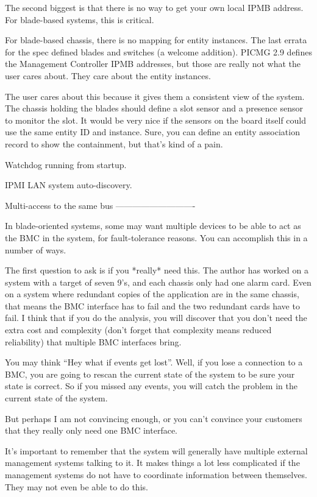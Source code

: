 The second biggest is that there is no way to get your own local IPMB
address.  For blade-based systems, this is critical.

For blade-based chassis, there is no mapping for entity instances.
The last errata for the spec defined blades and switches (a welcome
addition).  PICMG 2.9 defines the Management Controller IPMB
addresses, but those are really not what the user cares about.  They
care about the entity instances.

The user cares about this because it gives them a consistent view of
the system.  The chassis holding the blades should define a slot
sensor and a presence sensor to monitor the slot.  It would be very
nice if the sensors on the board itself could use the same entity ID
and instance.  Sure, you can define an entity association record to
show the containment, but that's kind of a pain.

Watchdog running from startup.

IPMI LAN system auto-discovery.


Multi-access to the same bus
----------------------------

In blade-oriented systems, some may want multiple devices to be able
to act as the BMC in the system, for fault-tolerance reasons.  You can
accomplish this in a number of ways.

The first question to ask is if you *really* need this.  The author
has worked on a system with a target of seven 9's, and each chassis
only had one alarm card.  Even on a system where redundant copies of
the application are in the same chassis, that means the BMC interface
has to fail and the two redundant cards have to fail.  I think that if
you do the analysis, you will discover that you don't need the extra
cost and complexity (don't forget that complexity means reduced
reliability) that multiple BMC interfaces bring.

You may think ``Hey what if events get lost''.  Well, if you lose a
connection to a BMC, you are going to rescan the current state of the
system to be sure your state is correct.  So if you missed any events,
you will catch the problem in the current state of the system.

But perhaps I am not convincing enough, or you can't convince your
customers that they really only need one BMC interface.

It's important to remember that the system will generally have
multiple external management systems talking to it.  It makes things a
lot less complicated if the management systems do not have to
coordinate information between themselves.  They may not even be able
to do this.

